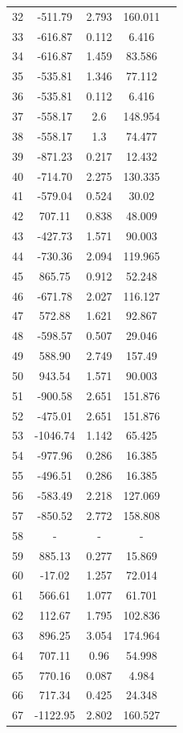 {\begin{longtable}{ccccc}
32 & -511.79 & 2.793 & 160.011 \\
33 & -616.87 & 0.112 & 6.416 \\
34 & -616.87 & 1.459 & 83.586 \\
35 & -535.81 & 1.346 & 77.112 \\
36 & -535.81 & 0.112 & 6.416 \\
37 & -558.17 & 2.6 & 148.954 \\
38 & -558.17 & 1.3 & 74.477 \\
39 & -871.23 & 0.217 & 12.432 \\
40 & -714.70 & 2.275 & 130.335 \\
41 & -579.04 & 0.524 & 30.02 \\
42 & 707.11 & 0.838 & 48.009 \\
43 & -427.73 & 1.571 & 90.003 \\
44 & -730.36 & 2.094 & 119.965 \\
45 & 865.75 & 0.912 & 52.248 \\
46 & -671.78 & 2.027 & 116.127 \\
47 & 572.88 & 1.621 & 92.867 \\
48 & -598.57 & 0.507 & 29.046 \\
49 & 588.90 & 2.749 & 157.49 \\
50 & 943.54 & 1.571 & 90.003 \\
51 & -900.58 & 2.651 & 151.876 \\
52 & -475.01 & 2.651 & 151.876 \\
53 & -1046.74 & 1.142 & 65.425 \\
54 & -977.96 & 0.286 & 16.385 \\
55 & -496.51 & 0.286 & 16.385 \\
56 & -583.49 & 2.218 & 127.069 \\
57 & -850.52 & 2.772 & 158.808 \\
58 & - & - & -  \\ 
59 & 885.13 & 0.277 & 15.869 \\
60 & -17.02 & 1.257 & 72.014 \\
61 & 566.61 & 1.077 & 61.701 \\
62 & 112.67 & 1.795 & 102.836 \\
63 & 896.25 & 3.054 & 174.964 \\
64 & 707.11 & 0.96 & 54.998 \\
65 & 770.16 & 0.087 & 4.984 \\
66 & 717.34 & 0.425 & 24.348 \\
67 & -1122.95 & 2.802 & 160.527 \\

\end{longtable}}

